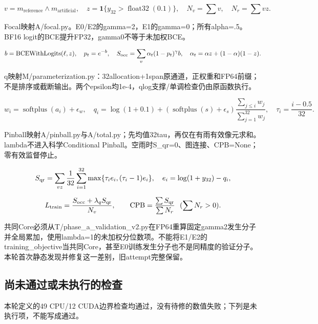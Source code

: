 \documentclass[UTF8,fontset=fandol,10pt]{ctexart}
\begin{document}
\[
v=m_{\mathrm{reference}}\land m_{\mathrm{artificial}},\quad
z=\mathbf1\{y_{32}>\operatorname{float32}(0.1)\},\quad
N_v=\sum v,\quad N_r=\sum vz.
\]


Focal映射A/\allowbreak{}focal.py。E0/\allowbreak{}E2的gamma=2，E1的gamma=0；所有alpha=.5。BF16 logit的BCE提升FP32，gamma0不等于未加权BCE。

\[
b=\operatorname{BCEWithLogits}(\ell,z),\quad p_t=e^{-b},\quad
S_{\rm occ}=\sum_v\alpha_t(1-p_t)^\gamma b,\quad
\alpha_t=\alpha z+(1-\alpha)(1-z).
\]


q映射M/\allowbreak{}parameterization.py：32allocation+1span原通道，正权重和FP64前缀；不是排序或截断输出。两个epsilon均1e-4，qlog支撑/\allowbreak{}单调检查仍由原函数执行。

\[
w_i=\operatorname{softplus}(a_i)+\epsilon_w,\quad
q_i=\log(1+0.1)+(\operatorname{softplus}(s)+\epsilon_s)
\frac{\sum_{j\le i}w_j}{\sum_{j=1}^{32}w_j},\quad
\tau_i=\frac{i-0.5}{32}.
\]


Pinball映射A/\allowbreak{}pinball.py与A/\allowbreak{}total.py；先均值32tau，再仅在有雨有效像元求和。lambda不进入科学Conditional Pinball。空雨时S\_\allowbreak{}qr=0、图连接、CPB=None；零有效监督停止。

\[
S_{\rm qr}=\sum_{vz}\frac1{32}\sum_{i=1}^{32}
\max\{\tau_i e_i,(\tau_i-1)e_i\},\quad
e_i=\log(1+y_{32})-q_i,
\]

\[
L_{\rm train}=\frac{S_{\rm occ}+\lambda_qS_{\rm qr}}{N_v},\qquad
\mathrm{CPB}=\frac{\sum S_{\rm qr}}{\sum N_r}\ \ (\sum N_r>0).
\]


共同Core必须从T/\allowbreak{}phase\_\allowbreak{}a\_\allowbreak{}validation\_\allowbreak{}v2.py在FP64重算固定gamma2发生分子并全局累加，使用lambda=1的未加权分位数项。不能将E1/\allowbreak{}E2的training\_\allowbreak{}objective当共同Core，甚至E0训练发生分子也不是同精度的验证分子。本轮首次静态发现并修复这一差别，旧attempt完整保留。

\subsection{尚未通过或未执行的检查}

本轮定义的49 CPU/\allowbreak{}12 CUDA边界检查均通过，没有待修的数值失败；下列是未执行项，不能写成通过。
\end{document}
